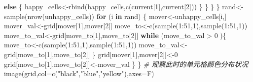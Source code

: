 \documentclass[]{tufte-book}
\newenvironment{Shaded}{}{}
\newcommand{\AttributeTok}[1]{\textcolor[rgb]{0.49,0.56,0.16}{#1}}
\newcommand{\CommentTok}[1]{\textcolor[rgb]{0.38,0.63,0.69}{\textit{#1}}}
\newcommand{\ControlFlowTok}[1]{\textcolor[rgb]{0.00,0.44,0.13}{\textbf{#1}}}
\newcommand{\DecValTok}[1]{\textcolor[rgb]{0.25,0.63,0.44}{#1}}
\newcommand{\FunctionTok}[1]{\textcolor[rgb]{0.02,0.16,0.49}{#1}}
\newcommand{\NormalTok}[1]{#1}
\newcommand{\OtherTok}[1]{\textcolor[rgb]{0.00,0.44,0.13}{#1}}
\newcommand{\SpecialCharTok}[1]{\textcolor[rgb]{0.25,0.44,0.63}{#1}}
\newcommand{\StringTok}[1]{\textcolor[rgb]{0.25,0.44,0.63}{#1}}
\begin{document}
\begin{Shaded}
\begin{Highlighting}[]
                                \ControlFlowTok{else}\NormalTok{ \{}
\NormalTok{                                        happy\_cells}\OtherTok{\textless{}{-}}\FunctionTok{rbind}\NormalTok{(happy\_cells,}\FunctionTok{c}\NormalTok{(current[}\DecValTok{1}\NormalTok{],current[}\DecValTok{2}\NormalTok{]))}
\NormalTok{                                \}}
\NormalTok{                        \}}
\NormalTok{                \}}
\NormalTok{        \} }
\NormalTok{        rand}\OtherTok{\textless{}{-}}\FunctionTok{sample}\NormalTok{(}\FunctionTok{nrow}\NormalTok{(unhappy\_cells))}
        \ControlFlowTok{for}\NormalTok{ (i }\ControlFlowTok{in}\NormalTok{ rand) \{}
\NormalTok{                mover}\OtherTok{\textless{}{-}}\NormalTok{unhappy\_cells[i,]}
\NormalTok{                mover\_val}\OtherTok{\textless{}{-}}\NormalTok{grid[mover[}\DecValTok{1}\NormalTok{],mover[}\DecValTok{2}\NormalTok{]]}
\NormalTok{                move\_to}\OtherTok{\textless{}{-}}\FunctionTok{c}\NormalTok{(}\FunctionTok{sample}\NormalTok{(}\DecValTok{1}\SpecialCharTok{:}\DecValTok{51}\NormalTok{,}\DecValTok{1}\NormalTok{),}\FunctionTok{sample}\NormalTok{(}\DecValTok{1}\SpecialCharTok{:}\DecValTok{51}\NormalTok{,}\DecValTok{1}\NormalTok{))}
\NormalTok{                move\_to\_val}\OtherTok{\textless{}{-}}\NormalTok{grid[move\_to[}\DecValTok{1}\NormalTok{],move\_to[}\DecValTok{2}\NormalTok{]]}
                \ControlFlowTok{while}\NormalTok{ (move\_to\_val }\SpecialCharTok{\textgreater{}} \DecValTok{0}\NormalTok{ )\{}
\NormalTok{                        move\_to}\OtherTok{\textless{}{-}}\FunctionTok{c}\NormalTok{(}\FunctionTok{sample}\NormalTok{(}\DecValTok{1}\SpecialCharTok{:}\DecValTok{51}\NormalTok{,}\DecValTok{1}\NormalTok{),}\FunctionTok{sample}\NormalTok{(}\DecValTok{1}\SpecialCharTok{:}\DecValTok{51}\NormalTok{,}\DecValTok{1}\NormalTok{))}
\NormalTok{                        move\_to\_val}\OtherTok{\textless{}{-}}\NormalTok{grid[move\_to[}\DecValTok{1}\NormalTok{],move\_to[}\DecValTok{2}\NormalTok{]]}
\NormalTok{                \}}
\NormalTok{                grid[mover[}\DecValTok{1}\NormalTok{],mover[}\DecValTok{2}\NormalTok{]]}\OtherTok{\textless{}{-}}\DecValTok{0}
\NormalTok{                grid[move\_to[}\DecValTok{1}\NormalTok{],move\_to[}\DecValTok{2}\NormalTok{]]}\OtherTok{\textless{}{-}}\NormalTok{mover\_val}
\NormalTok{        \}}
\NormalTok{\}}
\CommentTok{\# 观察此时的单元格颜色分布状况}
\FunctionTok{image}\NormalTok{(grid,}\AttributeTok{col=}\FunctionTok{c}\NormalTok{(}\StringTok{"black"}\NormalTok{,}\StringTok{"blue"}\NormalTok{,}\StringTok{"yellow"}\NormalTok{),}\AttributeTok{axes=}\NormalTok{F)}

\end{Highlighting}
\end{Shaded}
\end{document}
